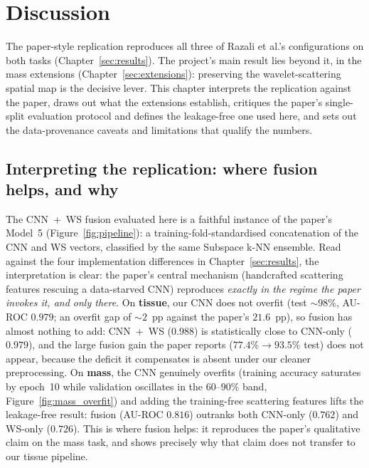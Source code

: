 
\chapter{Discussion} \label{sec:discussion}

The paper-style replication reproduces all three of Razali et al.'s configurations on
both tasks (Chapter~\ref{sec:results}). The project's main result lies beyond it,
in the mass extensions (Chapter~\ref{sec:extensions}): preserving the
wavelet-scattering spatial map is the decisive lever. This chapter interprets the replication against the paper, draws
out what the extensions establish, critiques the paper's single-split evaluation protocol
and defines the leakage-free one used here, and sets out the data-provenance caveats and
limitations that qualify the numbers.

\section{Interpreting the replication: where fusion helps, and why}

The CNN~+~WS fusion evaluated here is a faithful instance of the paper's Model~5
(Figure~\ref{fig:pipeline}): a training-fold-standardised concatenation of the CNN and WS
vectors, classified by the same Subspace k-NN ensemble. Read against the four implementation differences in Chapter~\ref{sec:results}, the
interpretation is clear: the paper's central mechanism (handcrafted scattering features
rescuing a data-starved CNN) reproduces \emph{exactly in the regime the paper invokes it,
and only there}. On
\textbf{tissue}, our CNN does not overfit (test ${\sim}98\%$, AU-ROC $0.979$; an overfit
gap of ${\sim}2$~pp against the paper's $21.6$~pp), so fusion has almost nothing to add:
CNN~+~WS ($0.988$) is statistically close to CNN-only ($0.979$), and the large fusion
gain the paper reports ($77.4\% \rightarrow 93.5\%$ test) does not appear, because the
deficit it compensates is absent under our cleaner preprocessing. On \textbf{mass}, the
CNN genuinely overfits (training accuracy saturates by epoch~10 while validation
oscillates in the $60$--$90\%$ band, Figure~\ref{fig:mass_overfit}) and adding the
training-free scattering features lifts the leakage-free result: fusion (AU-ROC
$0.816$) outranks both CNN-only ($0.762$) and WS-only ($0.726$). This is where fusion helps: it reproduces the paper's qualitative claim
on the mass task, and shows precisely why that claim does not transfer to our
tissue pipeline.

